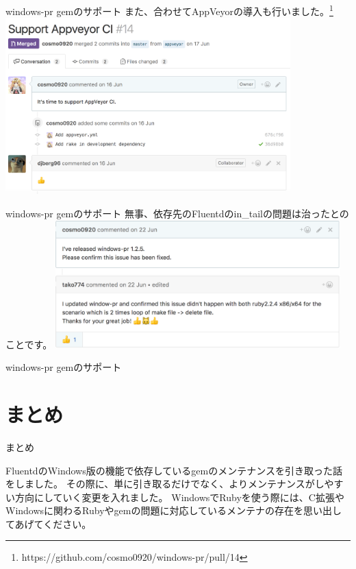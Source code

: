 \documentclass[12pt, unicode]{beamer}
\begin{document}
\begin{frame}{windows-pr gemのサポート}
  また、合わせてAppVeyorの導入も行いました。\footnote[frame]{https://github.com/cosmo0920/windows-pr/pull/14}
  \includegraphics[clip,width=11cm]{images/support_appveyor_windows-pr.png}
\end{frame}

\begin{frame}{windows-pr gemのサポート}
  無事、依存先のFluentdのin\_tailの問題は治ったとのことです。
  \includegraphics[clip,width=11cm]{images/fixed_in_tail_invalid_handle_in_windows.png}
\end{frame}

\begin{frame}{windows-pr gemのサポート}
  \Large {
  }
\end{frame}

\section[]{まとめ}
\begin{frame}{まとめ}
  \begin{block}{}
    FluentdのWindows版の機能で依存しているgemのメンテナンスを引き取った話をしました。\newline
    その際に、単に引き取るだけでなく、よりメンテナンスがしやすい方向にしていく変更を入れました。\newline
    WindowsでRubyを使う際には、C拡張やWindowsに関わるRubyやgemの問題に対応しているメンテナの存在を思い出してあげてください。
  \end{block}
\end{frame}
\end{document}
